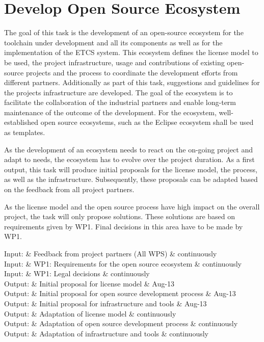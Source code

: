 \documentclass{template/openetcs_article}
\begin{document}
\section{Develop Open Source Ecosystem}
The goal of this task is the development of an open-source ecosystem for the toolchain under development and all its components as well as for the implementation of the ETCS system. This ecosystem defines the license model to be used, the project infrastructure, usage and contributions of existing open-source projects and the process to coordinate the development efforts from different partners. Additionally as part of this task, suggestions and guidelines for the projects infrastructure are developed. The goal of the ecosystem is to facilitate the collaboration of the industrial partners and enable long-term maintenance of the outcome of the development. For the ecosystem, well-established open source ecosystems, such as the Eclipse ecosystem shall be used as templates.

As the development of an ecosystem needs to react on the on-going project and adapt to needs, the ecosystem has to evolve over the project duration. As a first output, this task will produce initial proposals for the license model, the process, as well as the infrastructure. Subsequently, these proposals can be adapted based on the feedback from all project partners.

As the license model and the open source process have high impact on the overall project, the task will only propose solutions. These solutions are based on requirements given by WP1. Final decisions in this area have to be made by WP1. 

\begin{inoutput}
Input: & Feedback from project partners (All WPS) & continuously \\
Input: & WP1: Requirements for the open source ecosystem & continuously \\
Input: & WP1: Legal decisions & continuously \\
\hline
Output: & Initial proposal for license model & Aug-13 \\
Output: & Initial proposal for open source development process & Aug-13 \\
Output: & Initial proposal for infrastructure and tools & Aug-13 \\
Output: & Adaptation of license model & continuously \\
Output: & Adaptation of open source development process & continuously \\
Output: & Adaptation of infrastructure and tools & continuously \\
\end{inoutput}
\end{document}
